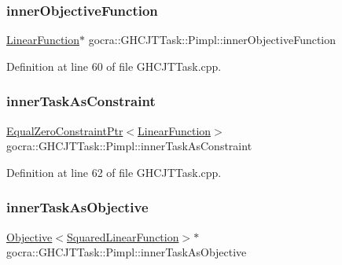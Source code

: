 \subsubsection{\texorpdfstring{inner\+Objective\+Function}{innerObjectiveFunction}}
{\footnotesize\ttfamily \hyperlink{classocra_1_1LinearFunction}{Linear\+Function}$\ast$ gocra\+::\+G\+H\+C\+J\+T\+Task\+::\+Pimpl\+::inner\+Objective\+Function}



Definition at line 60 of file G\+H\+C\+J\+T\+Task.\+cpp.

\hypertarget{structgocra_1_1GHCJTTask_1_1Pimpl_aca6261d2f483c550e6e71c4d31b7c0c1}{}\label{structgocra_1_1GHCJTTask_1_1Pimpl_aca6261d2f483c550e6e71c4d31b7c0c1} 
\subsubsection{\texorpdfstring{inner\+Task\+As\+Constraint}{innerTaskAsConstraint}}
{\footnotesize\ttfamily \hyperlink{classocra_1_1EqualZeroConstraintPtr}{Equal\+Zero\+Constraint\+Ptr}$<$\hyperlink{classocra_1_1LinearFunction}{Linear\+Function}$>$ gocra\+::\+G\+H\+C\+J\+T\+Task\+::\+Pimpl\+::inner\+Task\+As\+Constraint}



Definition at line 62 of file G\+H\+C\+J\+T\+Task.\+cpp.

\hypertarget{structgocra_1_1GHCJTTask_1_1Pimpl_a43d0c542d4107893610d8d07cce2fdd0}{}\label{structgocra_1_1GHCJTTask_1_1Pimpl_a43d0c542d4107893610d8d07cce2fdd0} 
\subsubsection{\texorpdfstring{inner\+Task\+As\+Objective}{innerTaskAsObjective}}
{\footnotesize\ttfamily \hyperlink{classocra_1_1Objective}{Objective}$<$\hyperlink{classocra_1_1SquaredLinearFunction}{Squared\+Linear\+Function}$>$$\ast$ gocra\+::\+G\+H\+C\+J\+T\+Task\+::\+Pimpl\+::inner\+Task\+As\+Objective}



